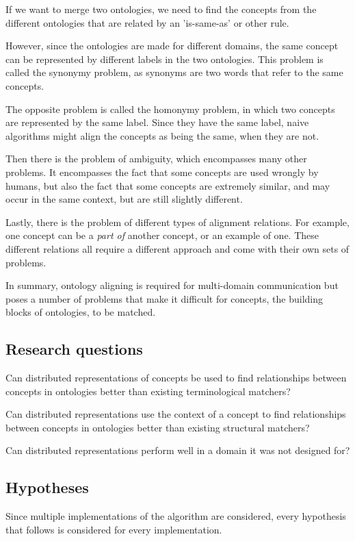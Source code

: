 \documentclass{article}
\begin{document}
 If we want to merge two ontologies, we need to find the concepts from the different ontologies that are related by an 'is-same-as' or other rule.
 
 However, since the ontologies are made for different domains, the same concept can be represented by different labels in the two ontologies. This problem is called the synonymy problem, as synonyms are two words that refer to the same concepts.
 
 The opposite problem is called the homonymy problem, in which two concepts are represented by the same label. Since they have the same label, naive algorithms might align the concepts as being the same, when they are not.
 
 Then there is the problem of ambiguity, which encompasses many other problems. It encompasses the fact that some concepts are used wrongly by humans, but also the fact that some concepts are extremely similar, and may occur in the same context, but are still slightly different.
 
 Lastly, there is the problem of different types of alignment relations. For example, one concept can be a \emph{part of} another concept, or an example of one. These different relations all require a different approach and come with their own sets of problems.
 
 In summary, ontology aligning is required for multi-domain communication but poses a number of problems that make it difficult for concepts, the building blocks of ontologies, to be matched.
 \subsection{Research questions}
 Can distributed representations of concepts be used to find relationships between concepts in ontologies better than existing terminological matchers?
 
 Can distributed representations use the context of a concept to find relationships between concepts in ontologies better than existing structural matchers?
 
 Can distributed representations perform well in a domain it was not designed for?
 
 \subsection{Hypotheses}
 Since multiple implementations of the algorithm are considered, every hypothesis that follows is considered for every implementation.
 
\end{document}
